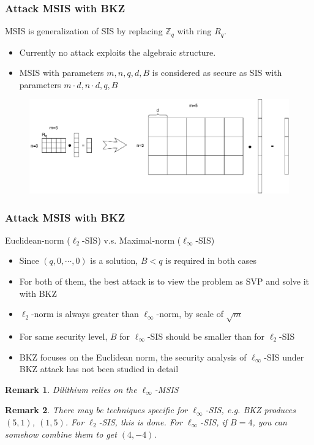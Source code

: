 \documentclass{beamer}
\newcommand{\bbZ}{\mathbb{Z}}
\newtheorem*{remark}{Remark}
\begin{document}
\frame
{
  \frametitle{Attack MSIS with BKZ}

  MSIS is generalization of SIS by replacing $\bbZ_q$ with ring $R_q$.
  \begin{itemize}
  	\item Currently no attack exploits the algebraic structure.
  	\item MSIS with parameters $m,n,q,d,B$ is considered as secure as SIS with parameters $m\cdot d,n\cdot d,q,B$
  \end{itemize}
  \begin{figure}[ht!]
  \includegraphics[width=\textwidth]{files/MSIS-SIS.pdf}
  \end{figure}
}

\frame
{
  \frametitle{Attack MSIS with BKZ}
  Euclidean-norm ($\ell_2$-SIS) v.s. Maximal-norm ($\ell_{\infty}$-SIS)
  \begin{itemize}
  	\item Since $(q,0,\cdots,0)$ is a solution, $B<q$ is required in both cases
  	\item For both of them, the best attack is to view the problem as SVP and solve it with BKZ
  	\item $\ell_2$-norm is always greater than $\ell_{\infty}$-norm, by scale of $\sqrt{m}$
  	\item For same security level, $B$ for $\ell_{\infty}$-SIS should be smaller than for $\ell_2$-SIS
  	\item BKZ focuses on the Euclidean norm, the security analysis of $\ell_{\infty}$-SIS under BKZ attack has not been studied in detail
  \end{itemize}

  \begin{remark}
  Dilithium relies on the $\ell_{\infty}$-MSIS
  \end{remark}

  \begin{remark}
  There may be techniques specific for $\ell_{\infty}$-SIS, e.g. BKZ produces $(5,1)$, $(1,5)$. For $\ell_2$-SIS, this is done. For $\ell_{\infty}$-SIS, if $B=4$, you can somehow combine them to get $(4,-4)$.
  \end{remark}
}
\end{document}
